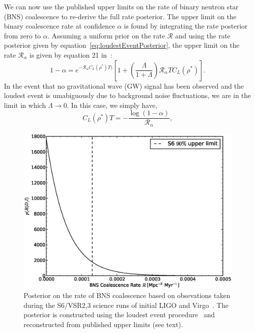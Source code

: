 \documentclass[twocolumn,nofootinbib]{revtex4-1}
\newcommand{\cbcrate}{{{\mathcal R}}}
\newcommand{\rhostar}{{\rho^*}}
\def\bns#1{binary neutron star#1 (BNS#1)\gdef\bns{BNS}}
\def\gw#1{gravitational wave#1 (GW#1)\gdef\gw{GW}}
\begin{document}
We can now use the published upper limits on the rate of \bns{} coalescence to
re-derive the full rate posterior.  The upper limit on the binary coalescence
rate at confidence $\alpha$ is found by integrating the rate posterior from zero
to $\alpha$.  Assuming a uniform prior on the rate $\cbcrate$ and using the rate
posterior given by equation~\ref{eq:loudestEventPosterior}, the upper limit on
the rate $\cbcrate_{\alpha}$ is given by equation 21 in~\cite{BradyFairhurst08}:
%
\begin{equation}
1-\alpha =  e^{-\cbcrate_{\alpha} C_L(\rhostar)T)}
\left[ 
1+ \left(\frac{\Lambda}{1+\Lambda}\right) \cbcrate_{\alpha} T C_L(\rhostar)
\right ].
\label{eq:rateIntegral}
\end{equation}
%
In the event that no \gw{} signal has been observed and the loudest event is
umabiguously due to background noise fluctuations, we are in the limit in which
$\Lambda \rightarrow 0$.  In this case, we simply have,
\begin{equation}
C_L(\rhostar)T = -\frac{\log(1-\alpha)}{\cbcrate_{\alpha}},
\end{equation}
%
%

\begin{figure}
\centering
\includegraphics[width=\linewidth]{S6_rate.eps}
\caption{Posterior on the rate of \bns{} coalescence based on obsevations taken
    during the S6/VSR2,3 science runs of initial LIGO and
    Virgo~\cite{S6lowmass}. The posterior is constructed using the loudest event
    procedure~\cite{Biswas09,BradyFairhurst08} and reconstructed from published
upper limits (see text).\label{fig:s6rate}}
\end{figure}
\end{document}
